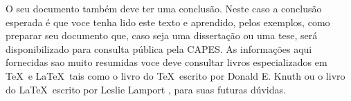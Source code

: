 
O seu documento também deve ter uma conclusão. Neste caso a conclusão esperada é que voce tenha lido este texto e aprendido, pelos exemplos, como preparar seu documento que, caso seja uma dissertação ou uma tese, será disponibilizado para consulta pública pela CAPES. As informações aqui fornecidas sao muito resumidas voce deve consultar livros especializados em \TeX \ e \LaTeX \ tais como o livro do \TeX \ escrito por Donald E. Knuth \cite{texbook} ou o livro do \LaTeX \ escrito por Leslie Lamport \cite{latexbook}, para suas futuras dúvidas.
%
%
%
%

\lipsum[1-2]